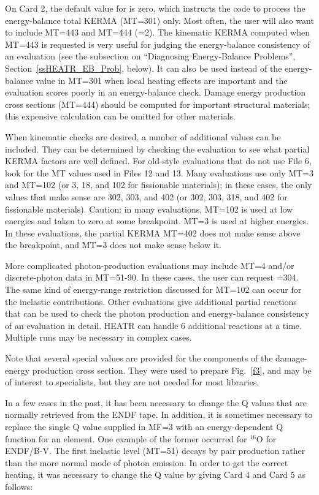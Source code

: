 On Card 2, the default value for  is zero, which
instructs the code to process the energy-balance total KERMA
(MT=301) only.  Most often, the user will also want to include MT=443
and MT=444 (=2).  The kinematic KERMA computed
when MT=443 is requested is very useful for judging the
energy-balance consistency
of an evaluation (see the subsection on ``Diagnosing
Energy-Balance Problems'', Section~\ref{ssHEATR_EB_Prob},
below).  It can also be used instead
of the energy-balance value in MT=301 when local heating effects
are important and the evaluation scores poorly in an energy-balance
check.  Damage energy production cross sections (MT=444) should be
computed for important structural materials; this expensive
calculation can be omitted for other materials.

When kinematic checks are desired, a number of additional
 values can be included.  They can be determined by
checking the evaluation to see what partial KERMA factors are
well defined.  For old-style evaluations that do not use File 6,
look for the MT values used in Files 12 and 13.  Many
evaluations use only MT=3 and MT=102 (or 3, 18, and 102 for
fissionable materials); in these cases, the only 
values that make sense are 302, 303, and 402 (or 302, 303, 318,
and 402 for fissionable materials).  Caution: in many evaluations,
MT=102 is used at low energies and taken to zero at some
breakpoint.  MT=3 is used at higher energies.  In these
evaluations, the partial KERMA MT=402 does not make sense above
the breakpoint, and MT=3 does not make sense below it.

More complicated photon-production evaluations may include MT=4
and/or discrete-photon data in MT=51-90.  In these cases, the
user can request =304.  The same kind of energy-range
restriction discussed for MT=102 can occur for the inelastic
contributions.  Other evaluations give additional partial
reactions that can be used to check the photon production and
energy-balance consistency of an evaluation in detail.  HEATR
can handle 6 additional reactions at a time.  Multiple runs
may be necessary in complex cases.

Note that several special  values are provided for
the components of the damage-energy production cross section.
They were used to prepare Fig.~\ref{f3}, and may be of interest
to specialists, but they are not needed for most libraries.

In a few cases in the past, it has been necessary to change
the Q values that are normally retrieved from the ENDF tape.
In addition, it is sometimes necessary to replace the single
Q value supplied in MF=3 with an energy-dependent Q function
for an element.  One example of the former occurred for $^{16}$O
for ENDF/B-V.  The first inelastic level (MT=51) decays by
pair production rather than the more normal mode of photon
emission.  In order to get the correct heating, it was necessary
to change the Q value by giving Card 4 and Card 5 as follows:

